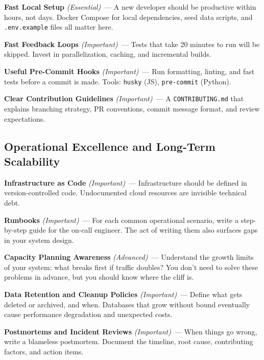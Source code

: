 \textbf{Fast Local Setup} \emph{(Essential)}~--- A new developer should be productive within hours, not days. Docker Compose for local dependencies, seed data scripts, and \texttt{.env.example} files all matter here.

\textbf{Fast Feedback Loops} \emph{(Important)}~--- Tests that take 20 minutes to run will be skipped. Invest in parallelization, caching, and incremental builds.

\textbf{Useful Pre-Commit Hooks} \emph{(Important)}~--- Run formatting, linting, and fast tests before a commit is made. Tools: \texttt{husky} (JS), \texttt{pre-commit} (Python).

\textbf{Clear Contribution Guidelines} \emph{(Important)}~--- A \texttt{CONTRIBUTING.md} that explains branching strategy, PR conventions, commit message format, and review expectations.

\subsection*{Operational Excellence and Long-Term Scalability}\label{writing-good-code:operational-excellence-and-long-term-scalability}

\textbf{Infrastructure as Code} \emph{(Important)}~--- Infrastructure should be defined in version-controlled code. Undocumented cloud resources are invisible technical debt.

\textbf{Runbooks} \emph{(Important)}~--- For each common operational scenario, write a step-by-step guide for the on-call engineer. The act of writing them also surfaces gaps in your system design.

\textbf{Capacity Planning Awareness} \emph{(Advanced)}~--- Understand the growth limits of your system: what breaks first if traffic doubles? You don't need to solve these problems in advance, but you should know where the cliff is.

\textbf{Data Retention and Cleanup Policies} \emph{(Important)}~--- Define what gets deleted or archived, and when. Databases that grow without bound eventually cause performance degradation and unexpected costs.

\textbf{Postmortems and Incident Reviews} \emph{(Important)}~--- When things go wrong, write a blameless postmortem. Document the timeline, root cause, contributing factors, and action items.

\label{writing-good-code:priority-reference-matrix}

